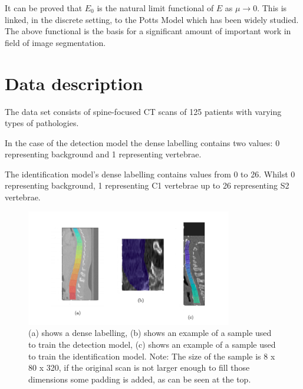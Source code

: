It can be proved that $E_0$ is the natural limit functional of $E$ as $\mu \to 0$. This is linked, in the discrete setting, to the \cite{Wu1982} Potts Model which has been widely studied. The above functional is the basis for a significant amount of important work in field of image segmentation.

\section{Data description}
The data set consists of spine-focused CT scans of 125 patients with varying types of pathologies. 

In the case of the detection model the dense labelling contains two values: 0 representing background and 1 representing vertebrae. 

The identification model’s dense labelling contains values from 0 to 26. Whilst 0 representing background, 1 representing C1 vertebrae up to 26 representing S2 vertebrae.

\begin{figure}[h]
    \centering \includegraphics[width=9cm]{images/labeled_data.png}
    \caption {(a) shows a dense labelling, (b) shows an example of a sample used to train the detection model, (c) shows an example of a sample used to train the identification model. Note: The size of the sample is 8 x 80 x 320, if the original scan is not larger enough to fill those dimensions some padding is added, as can be seen at the top.}
    \label{fig:labeled_data}
\end{figure}

